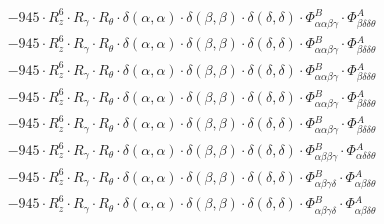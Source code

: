 \documentclass{article}
\begin{document}
\begin{subequations}
\begin{gather}
\begin{array}{c}
 \\[0.2em] 		 - 945 \cdot R_{z}^{6} \cdot R_{\gamma{}} \cdot R_{\theta{}} \cdot \delta{}\left(\alpha{}, \alpha{}\right) \cdot \delta{}\left(\beta{}, \beta{}\right) \cdot \delta{}\left(\delta{}, \delta{}\right) \cdot \Phi{}^{B}_{\alpha{}\alpha{}\beta{}\gamma{}} \cdot \Phi{}^{A}_{\beta{}\delta{}\delta{}\theta{}} 
 \\[0.2em] 		 - 945 \cdot R_{z}^{6} \cdot R_{\gamma{}} \cdot R_{\theta{}} \cdot \delta{}\left(\alpha{}, \alpha{}\right) \cdot \delta{}\left(\beta{}, \beta{}\right) \cdot \delta{}\left(\delta{}, \delta{}\right) \cdot \Phi{}^{B}_{\alpha{}\alpha{}\beta{}\gamma{}} \cdot \Phi{}^{A}_{\beta{}\delta{}\delta{}\theta{}} 
 \\[0.2em] 		 - 945 \cdot R_{z}^{6} \cdot R_{\gamma{}} \cdot R_{\theta{}} \cdot \delta{}\left(\alpha{}, \alpha{}\right) \cdot \delta{}\left(\beta{}, \beta{}\right) \cdot \delta{}\left(\delta{}, \delta{}\right) \cdot \Phi{}^{B}_{\alpha{}\alpha{}\beta{}\gamma{}} \cdot \Phi{}^{A}_{\beta{}\delta{}\delta{}\theta{}} 
 \\[0.2em] 		 - 945 \cdot R_{z}^{6} \cdot R_{\gamma{}} \cdot R_{\theta{}} \cdot \delta{}\left(\alpha{}, \alpha{}\right) \cdot \delta{}\left(\beta{}, \beta{}\right) \cdot \delta{}\left(\delta{}, \delta{}\right) \cdot \Phi{}^{B}_{\alpha{}\alpha{}\beta{}\gamma{}} \cdot \Phi{}^{A}_{\beta{}\delta{}\delta{}\theta{}} 
 \\[0.2em] 		 - 945 \cdot R_{z}^{6} \cdot R_{\gamma{}} \cdot R_{\theta{}} \cdot \delta{}\left(\alpha{}, \alpha{}\right) \cdot \delta{}\left(\beta{}, \beta{}\right) \cdot \delta{}\left(\delta{}, \delta{}\right) \cdot \Phi{}^{B}_{\alpha{}\alpha{}\beta{}\gamma{}} \cdot \Phi{}^{A}_{\beta{}\delta{}\delta{}\theta{}} 
 \\[0.2em] 		 - 945 \cdot R_{z}^{6} \cdot R_{\gamma{}} \cdot R_{\theta{}} \cdot \delta{}\left(\alpha{}, \alpha{}\right) \cdot \delta{}\left(\beta{}, \beta{}\right) \cdot \delta{}\left(\delta{}, \delta{}\right) \cdot \Phi{}^{B}_{\alpha{}\beta{}\beta{}\gamma{}} \cdot \Phi{}^{A}_{\alpha{}\delta{}\delta{}\theta{}} 
 \\[0.2em] 		 - 945 \cdot R_{z}^{6} \cdot R_{\gamma{}} \cdot R_{\theta{}} \cdot \delta{}\left(\alpha{}, \alpha{}\right) \cdot \delta{}\left(\beta{}, \beta{}\right) \cdot \delta{}\left(\delta{}, \delta{}\right) \cdot \Phi{}^{B}_{\alpha{}\beta{}\gamma{}\delta{}} \cdot \Phi{}^{A}_{\alpha{}\beta{}\delta{}\theta{}} 
 \\[0.2em] 		 - 945 \cdot R_{z}^{6} \cdot R_{\gamma{}} \cdot R_{\theta{}} \cdot \delta{}\left(\alpha{}, \alpha{}\right) \cdot \delta{}\left(\beta{}, \beta{}\right) \cdot \delta{}\left(\delta{}, \delta{}\right) \cdot \Phi{}^{B}_{\alpha{}\beta{}\gamma{}\delta{}} \cdot \Phi{}^{A}_{\alpha{}\beta{}\delta{}\theta{}} 

\end{array}
\end{gather}
\end{subequations}
\end{document}
